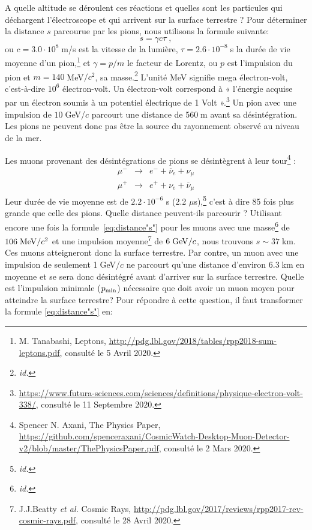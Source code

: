 \documentclass[a4paper, 12pt]{article}
\begin{document}
\begin{spacing}{1.5}
A quelle altitude se déroulent ces réactions et quelles sont les particules qui déchargent l'électroscope et qui arrivent sur la surface terrestre ? Pour déterminer la distance $s$ parcourue par les pions, nous utilisons la formule suivante:
\begin{equation}
s = \gamma c \tau\;, \label{eq:distance"s"}
\end{equation}
ou $c=3.0 \cdot 10^8\;$m/s est la vitesse de la lumière, $\tau=2.6 \cdot 10^{-8}\;$s la durée de vie moyenne d'un pion,\footnote{M. Tanabashi, Leptons, \url{http://pdg.lbl.gov/2018/tables/rpp2018-sum-leptons.pdf}, consulté le 5 Avril 2020.} et $\gamma = p / m$ le facteur de Lorentz, ou $p$ est l'impulsion du pion et $m = 140\;$MeV$/c^2$, sa masse.\footnote{\emph{id.}} L'unité MeV signifie mega électron-volt, c'est-à-dire $10^6$ électron-volt. Un électron-volt correspond à « l'énergie acquise par un électron soumis à un potentiel électrique de 1 Volt ».\footnote{\url{https://www.futura-sciences.com/sciences/definitions/physique-electron-volt-338/}, consulté le 11 Septembre 2020.} Un pion avec une impulsion de $10\;$GeV/$c$ parcourt une distance de 560$\;$m avant sa désintégration. Les pions ne peuvent donc pas être la source du rayonnement observé au niveau de la mer. 

Les muons provenant des désintégrations de pions se désintègrent à leur tour\footnote{Spencer N. Axani, The Physics Paper, \url{https://github.com/spenceraxani/CosmicWatch-Desktop-Muon-Detector-v2/blob/master/ThePhysicsPaper.pdf}, consulté le 2 Mars 2020.} :
\begin{eqnarray}
\mu^- &\rightarrow& e^- + {\overline \nu}_e + \nu_\mu \label{eq:mu-d}\\
\mu^+ &\rightarrow& e^+ + \nu_e + {\overline \nu}_\mu \label{eq:mu+d}
\end{eqnarray}
Leur durée de vie moyenne est de $2.2 \cdot 10^{-6}$ s (2.2 $\mu$s),\footnote{\emph{id.}} c'est à dire 85 fois plus grande que celle des pions. Quelle distance peuvent-ils parcourir ? Utilisant encore une fois la formule~\ref{eq:distance"s"} pour les muons avec une masse\footnote{\emph{id.}} de $106\;{\rm MeV}/c^2$ et une impulsion moyenne\footnote{J.J.Beatty \emph{et al.} Cosmic Rays, \url{http://pdg.lbl.gov/2017/reviews/rpp2017-rev-cosmic-rays.pdf}, consulté le 28 Avril 2020.} de $6\;{\rm GeV}/c$, nous trouvons $s\sim37\;$km. Ces muons atteigneront donc la surface terrestre. Par contre, un muon avec une impulsion de seulement 1$\;$GeV/$c$ ne parcourt qu'une distance d'environ 6.3$\;$km en moyenne et se sera donc désintégré avant d'arriver sur la surface terrestre. Quelle est l'impulsion minimale ($p_{\rm min}$) nécessaire que doit avoir un muon moyen pour atteindre la surface terrestre? Pour répondre à cette question, il faut transformer la formule \ref{eq:distance"s"} en:


\end{spacing}
\end{document}
